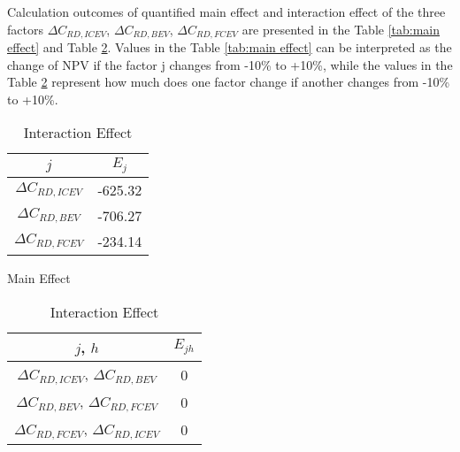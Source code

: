 Calculation outcomes of quantified main effect and interaction effect of the three factors $\Delta C_{RD,ICEV}$, $\Delta C_{RD,BEV}$, $\Delta C_{RD,FCEV}$ are presented in the Table \ref{tab:main effect} and Table \ref{tab:interaction effect}. Values in the Table \ref{tab:main effect} can be interpreted as the change of NPV if the factor j changes from -10\% to +10\%, while the values in the Table \ref{tab:interaction effect} represent how much does one factor change if another changes from -10\% to +10\%.
\begin{table}[h]
\begin{minipage}{0.45\textwidth}
\centering
\begin{tabular}{c|c}
\toprule
$j$&$E_j$\\
\midrule
$\Delta C_{RD, ICEV}$&-625.32 \\
$\Delta C_{RD, BEV}$&-706.27 \\
$\Delta C_{RD, FCEV}$&-234.14 \\
\bottomrule
\end{tabular}
\caption{Main Effect}\label{tab:main effect}
\end{minipage}
\hfill
\begin{minipage}{0.45\textwidth}
\centering
\begin{tabular}{c|c}
\toprule
$j$, $h$ & $E_{jh}$\\
\midrule
$\Delta C_{RD, ICEV}$, $\Delta C_{RD, BEV}$& 0\\
$\Delta C_{RD, BEV}$, $\Delta C_{RD, FCEV}$& 0\\
$\Delta C_{RD, FCEV}$, $\Delta C_{RD, ICEV}$& 0\\
\bottomrule
\end{tabular}
\caption{Interaction Effect}\label{tab:interaction effect}
\end{minipage}
\end{table}


